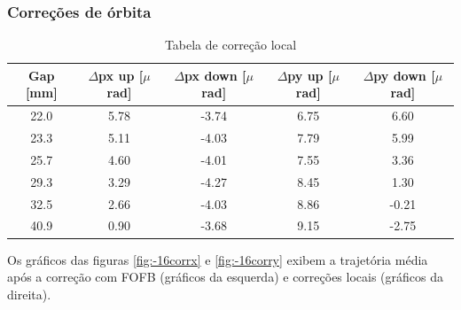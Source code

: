 \documentclass[a4paper,12pt]{article}
\begin{document}
\subsubsection{Correções de órbita}

\begin{table}[H]
\centering
\caption{Tabela de correção local}
\begin{tabular}{|c|c|c|c|c|}
\hline
Gap {[}mm{]} & $\Delta$px up {[}$\mu$rad{]} & $\Delta$px down {[}$\mu$rad{]} & $\Delta$py up {[}$\mu$rad{]} & $\Delta$py down {[}$\mu$rad{]} \\ \hline
22.0 & 5.78  & -3.74 & 6.75 & 6.60 \\ \hline
23.3 & 5.11  & -4.03 & 7.79 & 5.99 \\ \hline
25.7 & 4.60  & -4.01 & 7.55 & 3.36 \\ \hline
29.3 & 3.29  & -4.27 & 8.45 & 1.30 \\ \hline
32.5 &  2.66 & -4.03 & 8.86 & -0.21 \\ \hline
40.9 & 0.90  & -3.68 & 9.15 & -2.75 \\ \hline
\end{tabular}
\label{tab:corff-16}
\end{table}

Os gráficos das figuras \ref{fig:-16corrx} e \ref{fig:-16corry} exibem a trajetória média após a correção com FOFB (gráficos da esquerda) e correções locais (gráficos da direita).
\end{document}
